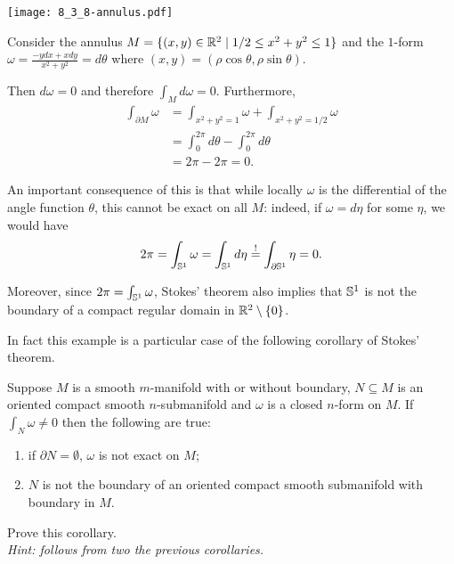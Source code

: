 \begin{example}
  \begin{marginfigure}
    \texttt{[image: 8\_3\_8-annulus.pdf]}
  \end{marginfigure}
  Consider the annulus $M=\{(x,y)\in\mathbb{R}^2 \mid 1/2\leq x^2+y^2 \leq 1\}$ and the $1$-form $\omega = \frac{-y dx + x dy}{x^2 + y^2} = d\theta$ where $(x,y) = (\rho\cos\theta, \rho\sin\theta)$.

  Then $d\omega = 0$ and therefore $\int_M d\omega = 0$.
  Furthermore,
  \begin{align}
    \int_{\partial M}\omega
     & = \int_{x^2 + y^2 =1} \omega + \int_{x^2+y^2 =1/2}\omega \\
     & = \int_{0}^{2\pi} d\theta - \int_0^{2\pi}d \theta        \\
     & = 2\pi - 2\pi = 0.
  \end{align}

  An important consequence of this is that while locally $\omega$ is the differential of the angle function $\theta$, this cannot be exact on all $M$: indeed, if $\omega = d\eta$ for some $\eta$, we would have
  \begin{equation}
    2\pi = \int_{\mathbb{S}^1}\omega = \int_{\mathbb{S}^1}d\eta \overset{!}{=} \int_{\partial\mathbb{S}^1}\eta = 0.
  \end{equation}

  Moreover, since $2\pi = \int_{\mathbb{S}^1}\omega$, Stokes' theorem also implies that $\mathbb{S}^1$ is not the boundary of a compact regular domain in $\mathbb{R}^2\setminus\{0\}$.
\end{example}

In fact this example is a particular case of the following corollary of Stokes' theorem.

\begin{corollary}
  Suppose $M$ is a smooth $m$-manifold with or without boundary, $N\subseteq M$ is an oriented compact smooth $n$-submanifold and $\omega$ is a closed $n$-form on $M$.
  If $\int_N\omega \neq 0$ then the following are true:
  \begin{enumerate}
    \item if $\partial N = \emptyset$, $\omega$ is not exact on $M$;
    \item $N$ is not the boundary of an oriented compact smooth submanifold with boundary in $M$.
  \end{enumerate}
\end{corollary}
\begin{exercise}
  Prove this corollary. \\
  \textit{\small Hint: follows from two the previous corollaries.}
\end{exercise}



